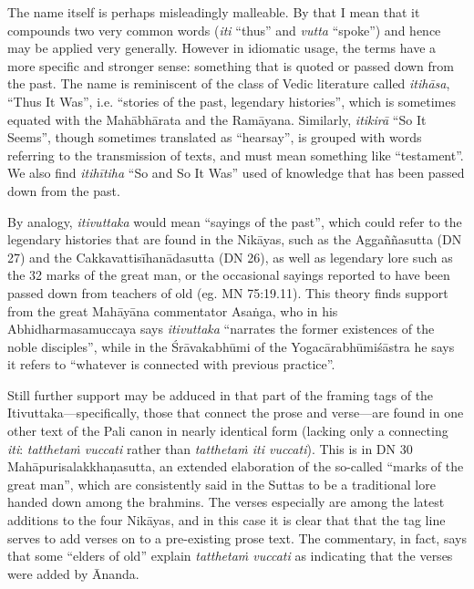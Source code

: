 \documentclass[12pt,openany]{book}%
\begin{document}
The name itself is perhaps misleadingly malleable. By that I mean that it compounds two very common words (\emph{iti} “thus” and \emph{vutta} “spoke”) and hence may be applied very generally. However in idiomatic usage, the terms have a more specific and stronger sense: something that is quoted or passed down from the past. The name is reminiscent of the class of Vedic literature called \emph{\textsanskrit{itihāsa}}, “Thus It Was”, i.e. “stories of the past, legendary histories”, which is sometimes equated with the \textsanskrit{Mahābhārata} and the \textsanskrit{Ramāyana}. Similarly, \emph{\textsanskrit{itikirā}} “So It Seems”, though sometimes translated as “hearsay”, is grouped with words referring to the transmission of texts, and must mean something like “testament”. We also find \emph{\textsanskrit{itihītiha}} “So and So It Was” used of knowledge that has been passed down from the past.

By analogy, \emph{itivuttaka} would mean “sayings of the past”, which could refer to the legendary histories that are found in the \textsanskrit{Nikāyas}, such as the \textsanskrit{Aggaññasutta} (DN 27) and the \textsanskrit{Cakkavattisīhanādasutta} (DN 26), as well as legendary lore such as the 32 marks of the great man, or the occasional sayings reported to have been passed down from teachers of old (eg. MN 75:19.11). This theory finds support from the great \textsanskrit{Mahāyāna} commentator \textsanskrit{Asaṅga}, who in his Abhidharmasamuccaya says \emph{itivuttaka} “narrates the former existences of the noble disciples”, while in the \textsanskrit{Śrāvakabhūmi} of the \textsanskrit{Yogacārabhūmiśāstra} he says it refers to “whatever is connected with previous practice”.

Still further support may be adduced in that part of the framing tags of the Itivuttaka—specifically, those that connect the prose and verse—are found in one other text of the Pali canon in nearly identical form (lacking only a connecting \emph{iti}: \emph{\textsanskrit{tatthetaṁ} vuccati} rather than \emph{\textsanskrit{tatthetaṁ} iti vuccati}). This is in DN 30 \textsanskrit{Mahāpurisalakkhaṇasutta}, an extended elaboration of the so-called “marks of the great man”, which are consistently said in the Suttas to be a traditional lore handed down among the brahmins. The verses especially are among the latest additions to the four \textsanskrit{Nikāyas}, and in this case it is clear that that the tag line serves to add verses on to a pre-existing prose text. The commentary, in fact, says that some “elders of old” explain \emph{\textsanskrit{tatthetaṁ} vuccati} as indicating that the verses were added by Ānanda.
\end{document}
